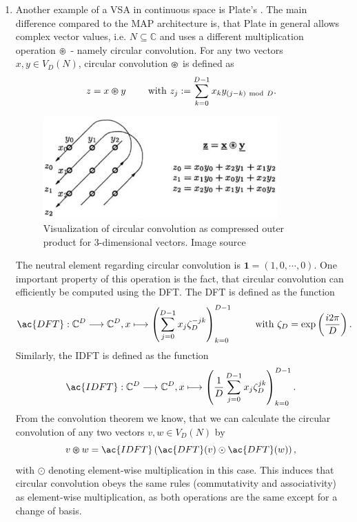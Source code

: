 \begin{ex}
\begin{enumerate}
		\item Another example of a \ac{VSA} in continuous space is Plate's  \cite{Plate1994, Plate1997}.
		The main difference compared to the \ac{MAP} architecture is, that Plate in general allows complex vector values, i.e. $N \subseteq \mathbb{C}$ and uses a different multiplication operation $\varoast$ - namely circular convolution.
		For any two vectors $x, y \in V_{D}(N)$, circular convolution $\varoast$ is defined as
		\begin{align*}
			z = x \varoast y \qquad \textrm{ with } z_{j} := \sum_{k=0}^{D-1} x_{k}y_{(j-k)\ \mathrm{mod}\ D}.
		\end{align*}
		\begin{figure}
			\centering
			\includegraphics[width=0.85\textwidth]{imgs/circular_convolution_visualization_hor.eps}
			\caption{Visualization of circular convolution as compressed outer product for $3$-dimensional vectors. Image source \cite{Plate1994a}}
			\label{fig:circ_conv}
		\end{figure}
		The neutral element regarding circular convolution is $\pmb{1} = \left(1, 0, \cdots, 0\right)$.
		One important property of this operation is the fact, that circular convolution can efficiently be computed using the \ac{DFT}.
		The \ac{DFT} is defined as the function
		\[
		\abb{\ac{DFT}}{\mathbb{C}^{D}}{\mathbb{C}^{D}}{x}{\left(\sum_{j=0}^{D-1} x_{j} \zeta_{D}^{-jk} \right)_{k=0}^{D-1}} \qquad \textrm{ with } \zeta_{D} = \exp\left( \frac{i 2 \pi}{D} \right).
		\]
		Similarly, the \ac{IDFT} is defined as the function
		\[
		\abb{\ac{IDFT}}{\mathbb{C}^{D}}{\mathbb{C}^{D}}{x}{\left( \frac{1}{D} \sum_{j=0}^{D-1} x_{j} \zeta_{D}^{jk} \right)_{k=0}^{D-1}}.
		\]
		From the convolution theorem \cite[Chap. 6]{Bracewell2000} we know, that we can calculate the circular convolution of any two vectors $v, w \in V_{D}(N)$ by
		\[
		v \varoast w = \ac{IDFT}\left(\ac{DFT}(v) \odot \ac{DFT}(w) \right),
		\]
		with $\odot$ denoting element-wise multiplication in this case.
		This induces that circular convolution obeys the same rules (commutativity and associativity) as element-wise multiplication, as both operations are the same except for a change of basis.
	\end{enumerate}
\end{ex}
